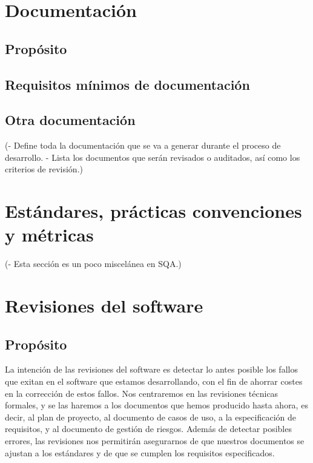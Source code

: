 \documentclass[spanish,a4paper,11pt, twoside]{report}	%
\begin{document}
\chapter{ Documentación}%
	\section{Propósito}
	\section{Requisitos mínimos de documentación}
	\section{Otra documentación}

	(- Define toda la documentación que se va a generar
	durante el proceso de desarrollo.
	- Lista los documentos que serán revisados o
	auditados, así como los criterios de revisión.)

\newpage
\mbox{}
\thispagestyle{empty}						%
\newpage

\chapter{ Estándares, prácticas convenciones y métricas}
	(- Esta sección es un poco miscelánea en SQA.) %

\newpage
\mbox{}
\thispagestyle{empty}						%
\newpage

\chapter{ Revisiones del software}
	\section{Propósito}
	La intención de las revisiones del software es detectar lo antes posible los fallos que exitan en el software que estamos desarrollando, con el fin de ahorrar costes en la corrección de estos fallos. Nos centraremos en las revisiones técnicas formales,
	y se las haremos a los documentos que hemos producido hasta ahora, es decir, al plan de proyecto, al documento de casos de uso, a la especificación de requisitos, y al documento de gestión de riesgos. Además de detectar posibles errores,
 	las revisiones nos permitirán asegurarnos de que nuestros documentos se ajustan a los estándares y de que se cumplen los requisitos especificados.
\end{document}
